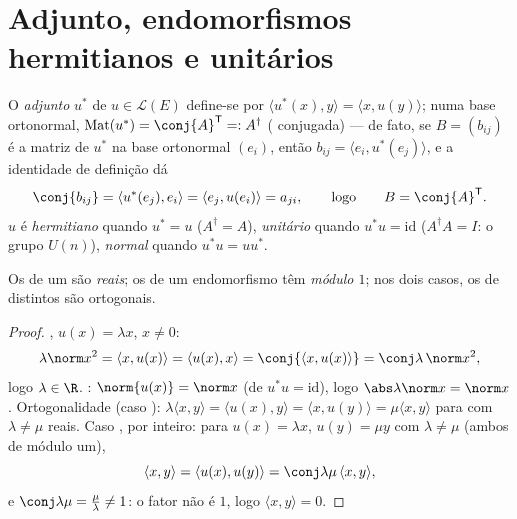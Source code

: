 \section{Adjunto, endomorfismos hermitianos e unitários}

\begin{definition}\label{def:b2:hermitian:adjoint}
O \emph{adjunto} $u^*$ de $u \in \mathcal{L}(E)$ define-se por
$\langle u^*(x), y\rangle = \langle x, u(y)\rangle$; numa
base ortonormal, $\operatorname{Mat}(u^*) = \conj{A}^{\mathsf T} =:
A^{\dagger}$ ( conjugada) --- de fato, se $B =
(b_{ij})$ é a matriz de $u^*$ na base ortonormal
$(e_i)$, então $b_{ij} = \langle e_i, u^*(e_j)\rangle$, e a
identidade de definição dá
\[
\conj{b_{ij}}
= \langle u^*(e_j), e_i\rangle
= \langle e_j, u(e_i)\rangle = a_{ji} ,
\qquad\text{logo}\qquad
B = \conj{A}^{\mathsf T} .
\] $u$ é
\emph{hermitiano} quando $u^* = u$
($A^\dagger = A$), \emph{unitário} quando $u^*u =
\mathrm{id}$ ($A^\dagger A = I$: o grupo $U(n)$), \emph{normal}
quando $u^*u = uu^*$.
\end{definition}

\begin{proposition}\label{prop:b2:hermitian:eigenvalues}
Os  de um  são \emph{reais};
os  de um endomorfismo  têm \emph{módulo $1$}; nos
dois casos, os  de  distintos são ortogonais.
\end{proposition}

\begin{proof}
, $u(x) = \lambda x$, $x \neq 0$:
\[
\lambda \norm x^2 = \langle x, u(x)\rangle = \langle u(x), x\rangle
= \conj{\langle x, u(x)\rangle} = \conj\lambda\,\norm x^2 ,
\]
logo $\lambda \in \R$. : $\norm{u(x)} = \norm x$ (de $u^*u =
\mathrm{id}$), logo $\abs\lambda\norm x = \norm x$. Ortogonalidade
(caso ): $\lambda\langle x, y\rangle = \langle u(x),
y\rangle = \langle x, u(y)\rangle = \mu\langle x, y\rangle$ para
 com $\lambda \neq \mu$ reais. Caso , por
inteiro: para $u(x) = \lambda x$, $u(y) = \mu y$ com $\lambda \neq
\mu$ (ambos de módulo um),
\[
\langle x, y\rangle = \langle u(x), u(y)\rangle
= \conj\lambda\mu\,\langle x, y\rangle ,
\]
e $\conj\lambda\mu = \frac{\mu}{\lambda} \neq 1$: o fator
não é $1$, logo $\langle x, y\rangle = 0$.
\end{proof}


